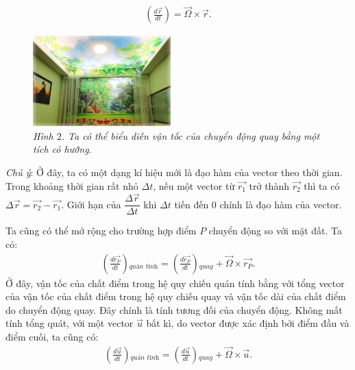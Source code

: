 \begin{multicols}{2}
	\begin{align*}
		\left(\!\!\frac{d\overrightarrow{r}}{dt}\!\!\right) = \overrightarrow{\Omega} \times \overrightarrow{r}. \tag{$1$}
	\end{align*}
	\begin{figure}[H]
		\vspace*{-5pt}
		\centering
		\captionsetup{labelformat= empty, justification=centering}
		\includegraphics[width= 0.475\textwidth]{12}
		\caption{\small\textit{\color{timhieukhoahoc}Hình $2$. Ta có thể biểu diễn vận tốc của chuyển động quay bằng một tích có hướng.}}
		\vspace*{-10pt}
	\end{figure}
	\begin{tBox}
		\textit{Chú ý}: Ở đây, ta có một dạng kí hiệu mới là đạo hàm của vector theo thời gian. Trong khoảng thời gian rất nhỏ $\Delta t$, nếu một \linebreak vector từ $\overrightarrow{r_1}$ trở thành $\overrightarrow{r_2}$ thì ta có $\Delta\overrightarrow{r} = \overrightarrow{r_2}- \overrightarrow{r_1}$. Giới hạn của $\dfrac{\Delta\overrightarrow{r}}{\Delta t}$ khi $\Delta t$ tiến đến $0$ chính là đạo hàm của vector.
	\end{tBox}
	\vskip 0.1cm
	Ta cũng có thể mở rộng cho trường hợp điểm $P$ chuyển động so với mặt đất. Ta có:
	\begin{align*}
		\left(\!\!\frac{d\overrightarrow{r_P}}{dt}\!\!\right)\!\!_\textit{quán tính} \!=\! \left(\!\! \frac{d\overrightarrow{r_P}}{dt}\!\!\right)\!\!_{quay} \!+\! \overrightarrow{\Omega} \!\times\! \overrightarrow{r_P}. \tag{$2$}
	\end{align*}
	Ở đây, vận tốc của chất điểm trong hệ quy chiếu quán tính bằng với tổng vector của vận tốc của chất điểm trong hệ quy chiếu quay và vận tốc dài của chất điểm do chuyển động quay. Đây chính là tính tương đối của chuyển động.
	\vskip 0.1cm
	Không mất tính tổng quát, với một vector $\overrightarrow{u}$ bất kì, do vector được xác định bởi điểm đầu và điểm cuối, ta cũng có:
	\begin{align*}
		\left(\!\!\frac{d\overrightarrow{u}}{dt}\!\!\right)\!\!_\textit{quán tính} \!=\! \left(\!\!\frac{d\overrightarrow{u}}{dt}\!\!\right)\!\!_{quay} \!+\! \overrightarrow{\Omega} \!\times\! \overrightarrow{u}. \tag{$3$}

\end{align*}
\end{multicols}
